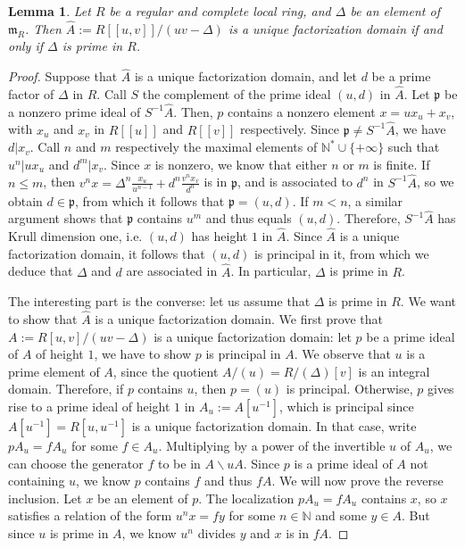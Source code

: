 \documentclass[a4paper,12pt]{amsart} %
\numberwithin{equation}{subsection}
\def\NN{\mathbb N}
\theoremstyle{definition}
\theoremstyle{plain}%
\newtheorem{lemma}[definition]{Lemma}
\theoremstyle{remark}
\begin{document}
\begin{lemma}\label{les anneaux locaux sont UFD}
	Let $R$ be a regular and complete local ring, and $\Delta$ be an element of $\mathfrak{m}_R$. Then $\widehat{A}:=R[[u,v]]/\left(uv-\Delta\right)$ is a unique factorization domain if and only if $\Delta$ is prime in $R$.
\end{lemma}

\begin{proof}
	Suppose that $\widehat{A}$ is a unique factorization domain, and let $d$ be a prime factor of $\Delta$ in $R$. Call $S$ the complement of the prime ideal $(u,d)$ in $\widehat{A}$. Let $\mathfrak p$ be a nonzero prime ideal of $S^{-1}\widehat A$. Then, $p$ contains a nonzero element $x=ux_u+x_v$, with $x_u$ and $x_v$ in $R[[u]]$ and $R[[v]]$ respectively. Since $\mathfrak p \neq S^{-1}\widehat A$, we have $d|x_v$. Call $n$ and $m$ respectively the maximal elements of $\NN^*\cup\{+\infty\}$ such that $u^n|ux_u$ and $d^m|x_v$. Since $x$ is nonzero, we know that either $n$ or $m$ is finite. If $n\leq m$, then $v^nx=\Delta^n\frac{x_u}{u^{n-1}}+d^n\frac{v^nx_v}{d^n}$ is in $\mathfrak p$, and is associated to $d^n$ in $S^{-1}\widehat{A}$, so we obtain $d\in\mathfrak p$, from which it follows that $\mathfrak p=(u,d)$. If $m<n$, a similar argument shows that $\mathfrak p$ contains $u^m$ and thus equals $(u,d)$. Therefore, $S^{-1}\widehat{A}$ has Krull dimension one, i.e. $(u,d)$ has height $1$ in $\widehat{A}$. Since $\widehat{A}$ is a unique factorization domain, it follows that $(u,d)$ is principal in it, from which we deduce that $\Delta$ and $d$ are associated in $\widehat{A}$. In particular, $\Delta$ is prime in $R$.
	
	The interesting part is the converse: let us assume that $\Delta$ is prime in $R$. We want to show that $\widehat{A}$ is a unique factorization domain. We first prove that $A:=R[u,v]/(uv-\Delta)$ is a unique factorization domain: let $p$ be a prime ideal of $A$ of height $1$, we have to show $p$ is principal in $A$. We observe that $u$ is a prime element of $A$, since the quotient $A/(u)=R/(\Delta)[v]$ is an integral domain. Therefore, if $p$ contains $u$, then $p=(u)$ is principal. Otherwise, $p$ gives rise to a prime ideal of height $1$ in $A_u:=A[u^{-1}]$, which is principal since $A[u^{-1}]=R[u,u^{-1}]$ is a unique factorization domain. In that case, write $pA_u=fA_u$ for some $f\in A_u$. Multiplying by a power of the invertible $u$ of $A_u$, we can choose the generator $f$ to be in $A\backslash uA$. Since $p$ is a prime ideal of $A$ not containing $u$, we know $p$ contains $f$ and thus $fA$. We will now prove the reverse inclusion. Let $x$ be an element of $p$. The localization $pA_u=fA_u$ contains $x$, so $x$ satisfies a relation of the form $u^nx=fy$ for some $n\in\NN$ and some $y\in A$. But since $u$ is prime in $A$, we know $u^n$ divides $y$ and $x$ is in $fA$.
	

\end{proof}
\end{document}
